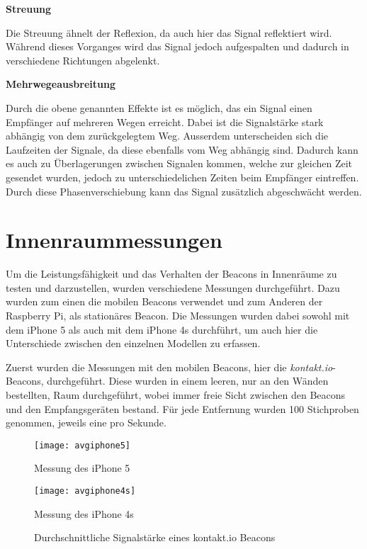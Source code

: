 \textbf{Streuung}

Die Streuung ähnelt der Reflexion, da auch hier das Signal reflektiert wird. Während dieses Vorganges wird das Signal jedoch aufgespalten und dadurch in verschiedene Richtungen abgelenkt.

\textbf{Mehrwegeausbreitung}

Durch die obene genannten Effekte ist es möglich, das ein Signal einen Empfänger auf mehreren Wegen erreicht. Dabei ist die Signalstärke stark abhängig von dem zurückgelegtem Weg. Ausserdem unterscheiden sich die Laufzeiten der Signale, da diese ebenfalls vom Weg abhängig sind. Dadurch kann es auch zu Überlagerungen zwischen Signalen kommen, welche zur gleichen Zeit gesendet wurden, jedoch zu unterschiedelichen Zeiten beim Empfänger eintreffen. 
Durch diese Phasenverschiebung kann das Signal zusätzlich abgeschwächt werden.


\section{Innenraummessungen}
\label{sec:dataandmeasurement:indoormeasure}
Um die Leistungsfähigkeit und das Verhalten der Beacons in Innenräume zu testen und darzustellen, wurden verschiedene Messungen durchgeführt. Dazu wurden zum einen die mobilen Beacons verwendet und zum Anderen der Raspberry Pi, als stationäres Beacon.
Die Messungen wurden dabei sowohl mit dem iPhone 5 als auch mit dem iPhone 4s durchführt, um auch hier die Unterschiede zwischen den einzelnen Modellen zu erfassen.


Zuerst wurden die Messungen mit den mobilen Beacons, hier die \emph{kontakt.io}-Beacons, durchgeführt.
Diese wurden in einem leeren, nur an den Wänden bestellten, Raum durchgeführt, wobei immer freie Sicht zwischen den Beacons und den Empfangsgeräten bestand. Für jede Entfernung wurden 100 Stichproben genommen, jeweils eine pro Sekunde.
\begin{figure}[h!]
	\centering
	\begin{minipage}[t]{5cm}
		\texttt{[image: avgiphone5]}
		\caption{Messung des iPhone 5}
		\label{avgiphone5-signalstrength}
	\end{minipage}
	\hspace{2cm}
	\begin{minipage}[t]{5cm}
			\texttt{[image: avgiphone4s]}
			\caption{Messung des iPhone 4s}
			\label{avgiphone4s-signalstrength}
	\end{minipage}
		\caption{Durchschnittliche Signalstärke eines kontakt.io Beacons}
		\label{signalstrength}
\end{figure}

